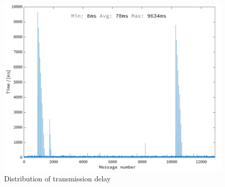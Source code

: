 \begin{figure}[H]
\centering
\includegraphics[scale=0.15]{img/figures/end-to-end2.png}
\caption{Distribution of transmission delay}
\label{fig:endToEndPlot}
\end{figure}
\noindent

